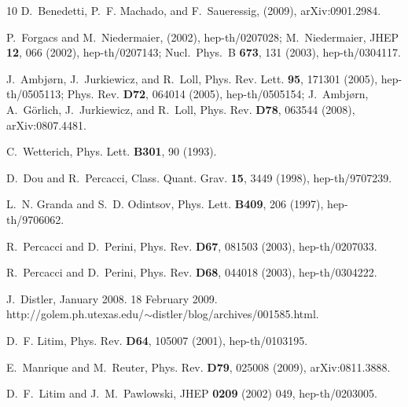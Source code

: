 \documentclass[preprint,preprintnumbers,amsmath,amssymb,nofootinbib,APS]{revtex4}
\newcommand{\2}{\sqrt{2\,}}
\begin{document}
\begin{thebibliography}{10}
D.~Benedetti, P.~F. Machado, and F.~Saueressig,
\newblock (2009), arXiv:0901.2984.

P.~Forgacs and M.~Niedermaier,
\newblock (2002), hep-th/0207028;
M.~Niedermaier,
\newblock JHEP {\bf 12}, 066 (2002), hep-th/0207143;
  Nucl.\ Phys.\  B {\bf 673}, 131 (2003), hep-th/0304117.

J.~Ambj\o rn, J.~Jurkiewicz, and R.~Loll,
\newblock Phys. Rev. Lett. {\bf 95}, 171301 (2005), hep-th/0505113;
\newblock Phys. Rev. {\bf D72}, 064014 (2005), hep-th/0505154;
J.~Ambj\o rn, A.~G{\"o}rlich, J.~Jurkiewicz, and R.~Loll,
\newblock Phys. Rev. {\bf D78}, 063544 (2008), arXiv:0807.4481.

C.~Wetterich,
\newblock Phys. Lett. {\bf B301}, 90 (1993).

D.~Dou and R.~Percacci,
\newblock Class. Quant. Grav. {\bf 15}, 3449 (1998), hep-th/9707239.

L.~N. Granda and S.~D. Odintsov,
\newblock Phys. Lett. {\bf B409}, 206 (1997), hep-th/9706062.

R.~Percacci and D.~Perini,
\newblock Phys. Rev. {\bf D67}, 081503 (2003), hep-th/0207033.

R.~Percacci and D.~Perini,
\newblock Phys. Rev. {\bf D68}, 044018 (2003), hep-th/0304222.

J.~Distler,
 January 2008. 18 February 2009. \\
\newblock  http://golem.ph.utexas.edu/$\sim$distler/blog/archives/001585.html.

D.~F. Litim,
\newblock Phys. Rev. {\bf D64}, 105007 (2001), hep-th/0103195.

E.~Manrique and M.~Reuter,
\newblock Phys. Rev. {\bf D79}, 025008 (2009), arXiv:0811.3888.

  D.~F.~Litim and J.~M.~Pawlowski,
 \newblock  JHEP {\bf 0209} (2002) 049, hep-th/0203005.


\end{thebibliography}
\end{document}
